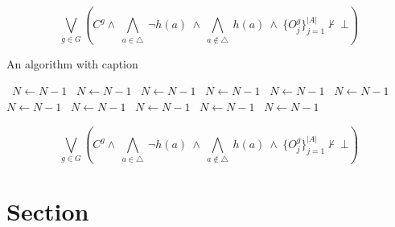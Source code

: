 \documentclass[a4paper]{article}
\begin{document}
\[\bigvee_{g\in G} (C^g \wedge\ \bigwedge_{a\in \triangle}\ \neg h(a)\ \wedge\ \bigwedge_{a\notin \triangle}\ h(a)\ \wedge\ \{O_j^g\}_{j=1}^{|A|} \nvdash\ \bot )\]

\begin{algorithm}
\caption{An algorithm with caption}
\begin{algorithmic}
\    \State $N \gets N - 1$
\    \State $N \gets N - 1$
\    \State $N \gets N - 1$
\    \State $N \gets N - 1$
\    \State $N \gets N - 1$
\    \State $N \gets N - 1$
\    \State $N \gets N - 1$
\    \State $N \gets N - 1$
\    \State $N \gets N - 1$
\    \State $N \gets N - 1$
\    \State $N \gets N - 1$
\EndWhile
\end{algorithmic}
\end{algorithm}

\[\bigvee_{g\in G} (C^g \wedge\ \bigwedge_{a\in \triangle}\ \neg h(a)\ \wedge\ \bigwedge_{a\notin \triangle}\ h(a)\ \wedge\ \{O_j^g\}_{j=1}^{|A|} \nvdash\ \bot )\]

\section{Section}
\end{document}

